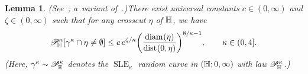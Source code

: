 \documentclass[a4paper, 11pt]{article}
\newtheorem{lemA}[theorem]{Lemma}
\theoremstyle{definition}
\numberwithin{equation}{section}
\numberwithin{figure}{section}
\newcommand{\SLE}[1][]{\operatorname{SLE}_{#1}}
\renewcommand{\dist}[1][]{\operatorname{dist}_{#1}}
\renewcommand{\diam}[1][]{\operatorname{diam}_{#1}}
\newcommand{\cHmeas}[1]{\mathscr{P}^{#1}_{\!\bH}}
\begin{document}
\begin{lemA} \textnormal{(See~\cite[Lemma~A.2]{Peltola-Wang:LDP}; a~variant of~\cite[Proposition~3.1]{Field-Lawler:Escape_probability_and_transience_for_SLE}.)}\label{thm:crosscut-half-plane}
There exist universal constants $c \in (0,\infty)$ and $\zeta \in (0,\infty)$ such that for any crosscut $\eta$ of $\mathbb{H}$, we have 
\begin{align*}
\cHmeas{\kappa}[\gamma^{\kappa} \cap \eta \ne \emptyset] \le c \, e^{\zeta/\kappa}\bigg(\frac{\diam(\eta)}{\dist(0,\eta)}\bigg)^{8/\kappa - 1} , \qquad \kappa \in (0,4].
\end{align*}
\textnormal{(}Here, $\gamma^{\kappa} \sim \cHmeas{\kappa}$ denotes the $\SLE[\kappa]$ random curve in $(\mathbb{H};0,\infty)$ with law $\cHmeas{\kappa}$.\textnormal{)}
\end{lemA}

\returnestimates*
\end{document}

